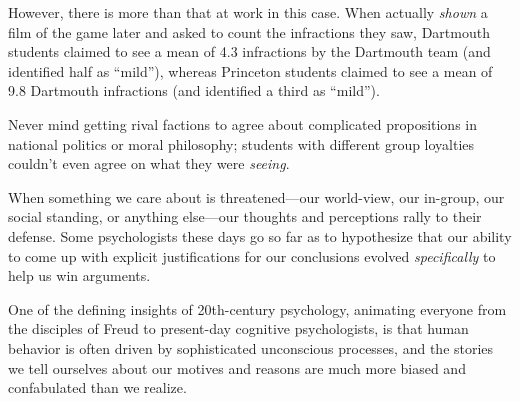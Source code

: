 {
 However, there is more than that at work in this case. When
actually \textit{shown} a film of the game later and asked to count the
infractions they saw, Dartmouth students claimed to see a mean of 4.3
infractions by the Dartmouth team (and identified half as
``mild''), whereas Princeton
students claimed to see a mean of 9.8 Dartmouth infractions (and
identified a third as ``mild'').}

{
 Never mind getting rival factions to agree about complicated
propositions in national politics or moral philosophy; students with
different group loyalties couldn't even agree on what
they were \textit{seeing}.}

{
 When something we care about is threatened---our world-view, our
in-group, our social standing, or anything else---our thoughts and
perceptions rally to their defense. Some
psychologists these days go so far as to hypothesize that our ability
to come up with explicit justifications for our conclusions evolved
\textit{specifically} to help us win arguments.}

{
 One of the defining insights of 20th-century psychology, animating
everyone from the disciples of Freud to present-day cognitive
psychologists, is that human behavior is often driven by sophisticated
unconscious processes, and the stories we tell ourselves about our
motives and reasons are much more biased and confabulated than we
realize.}


